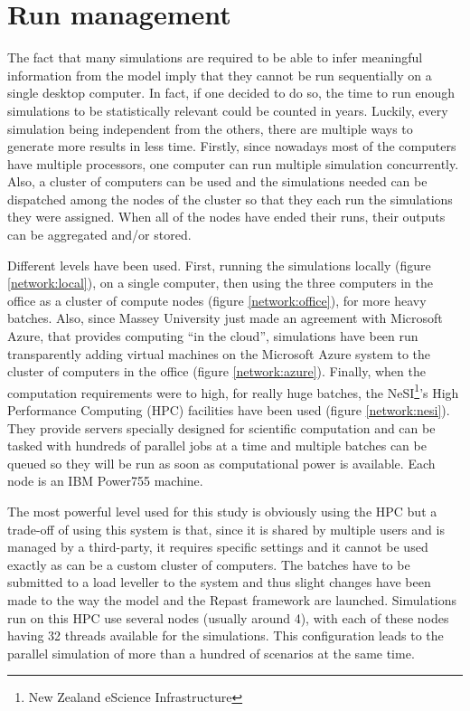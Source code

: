 \documentclass[a4paper,12pt]{report}
\begin{document}
\section{Run management}
The fact that many simulations are required to be able to infer meaningful information from the model imply that they cannot be run sequentially on a single desktop computer. In fact, if one decided to do so, the time to run enough simulations to be statistically relevant could be counted in years.
Luckily, every simulation being independent from the others, there are multiple ways to generate more results in less time.
Firstly, since nowadays most of the computers have multiple processors, one computer can run multiple simulation concurrently. Also, a cluster of computers can be used and the simulations needed can be dispatched among the nodes of the cluster so that they each run the simulations they were assigned. When all of the nodes have ended their runs, their outputs can be aggregated and/or stored.

Different levels have been used. First, running the simulations locally (figure \ref{network:local}), on a single computer, then using the three computers in the office as a cluster of compute nodes (figure \ref{network:office}), for more heavy batches. Also, since Massey University just made an agreement with Microsoft Azure, that provides computing “in the cloud”, simulations have been run transparently adding virtual machines on the Microsoft Azure system to the cluster of computers in the office (figure \ref{network:azure}).
Finally, when the computation requirements were to high, for really huge batches, the NeSI\footnote{New Zealand eScience Infrastructure}’s High Performance Computing (HPC) facilities have been used (figure \ref{network:nesi}). They provide servers specially designed for scientific computation and can be tasked with hundreds of parallel jobs at a time and multiple batches can be queued so they will be run as soon as computational power is available. Each node is an IBM Power755 machine.

The most powerful level used for this study is obviously using the HPC but a trade-off of using this system is that, since it is shared by multiple users and is managed by a third-party, it requires specific settings and it cannot be used exactly as can be a custom cluster of computers. The batches have to be submitted to a load leveller to the system and thus slight changes have been made to the way the model and the Repast framework are launched. Simulations run on this HPC use several nodes (usually around 4), with each of these nodes having 32 threads available for the simulations. This configuration leads to the parallel simulation of more than a hundred of scenarios at the same time.
\end{document}
